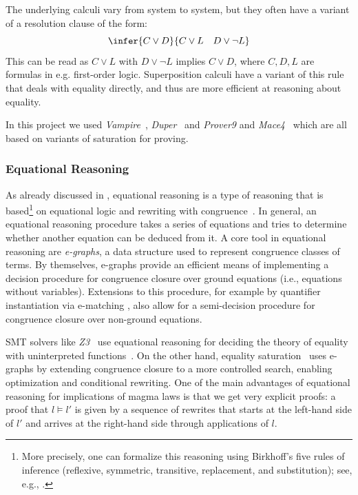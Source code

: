 \documentclass[12pt]{amsart}
\theoremstyle{definition}
\begin{document}
The underlying calculi vary from system to system, but they often have a variant of a resolution clause of the form:
\[\infer{C \lor D}{C \lor L \quad D \lor \neg L} \]
This can be read as $C \lor L$ with $D \lor \neg L$ implies $C \lor D$, where $C, D, L$ are formulas in e.g. first-order logic.
Superposition calculi have a variant of this rule that deals with equality directly, and thus are more efficient at reasoning about equality.

In this project we used \emph{Vampire}~\cite{DBLP:conf/cav/KovacsV13}, \emph{Duper}~\cite{DBLP:conf/itp/CluneQBA24} and \emph{Prover9} and \emph{Mace4}~\cite{prover9-mace4} which are all based on variants of saturation for proving.

\subsubsection{Equational Reasoning} As already discussed in , equational reasoning is a type of reasoning that is based\footnote{More precisely, one can formalize this reasoning using Birkhoff's five rules of inference (reflexive, symmetric, transitive, replacement, and substitution); see, e.g., \cite{burris}.} on equational logic and rewriting with congruence~\cite{term-rewriting}.
In general, an equational reasoning procedure takes a series of equations and tries to determine whether another equation can be deduced from it.
A core tool in equational reasoning are \emph{e-graphs}, a data structure used to represent congruence classes of terms.
By themselves, e-graphs provide an efficient means of implementing a decision procedure for congruence closure over ground equations (i.e., equations without variables).
Extensions to this procedure, for example by quantifier instantiation via e-matching \cite{DBLP:conf/cade/MouraB07}, also allow for a semi-decision procedure for congruence closure over non-ground equations.

SMT solvers like \emph{Z3}~\cite{DBLP:conf/tacas/MouraB08} use equational reasoning for deciding the theory of equality with uninterpreted functions~\cite{DBLP:series/txtcs/KroeningS16,DBLP:conf/cade/MouraB07}.
On the other hand, equality saturation~\cite{DBLP:journals/pacmpl/WillseyNWFTP21} uses e-graphs by extending congruence closure to a more controlled search, enabling optimization and conditional rewriting.
One of the main advantages of equational reasoning for implications of magma laws is that we get very explicit proofs: a proof that $l \models l'$ is given by a sequence of rewrites that starts at the left-hand side of $l'$ and arrives at the right-hand side through applications of $l$.
\end{document}
